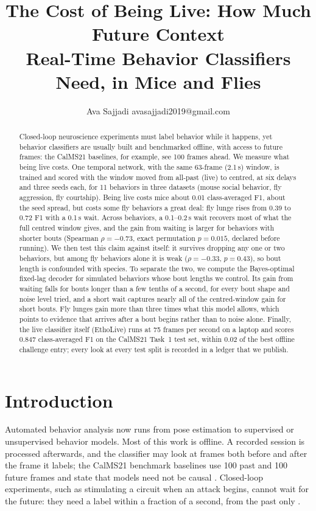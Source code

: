 \documentclass[10pt]{article}
\title{The Cost of Being Live: How Much Future Context\\ Real-Time Behavior Classifiers Need, in Mice and Flies}
\author{\name Ava Sajjadi \email avasajjadi2019@gmail.com \\
      \addr \todo{affiliation}}
\begin{document}
\maketitle

\begin{abstract}
Closed-loop neuroscience experiments must label behavior while it happens, yet behavior classifiers are usually built and benchmarked offline, with access to future frames: the CalMS21 baselines, for example, see 100 frames ahead. We measure what being live costs. One temporal network, with the same 63-frame (2.1\,s) window, is trained and scored with the window moved from all-past (live) to centred, at six delays and three seeds each, for 11 behaviors in three datasets (mouse social behavior, fly aggression, fly courtship). Being live costs mice about 0.01 class-averaged F1, about the seed spread, but costs some fly behaviors a great deal: fly lunge rises from 0.39 to 0.72 F1 with a 0.1\,s wait. Across behaviors, a 0.1--0.2\,s wait recovers most of what the full centred window gives, and the gain from waiting is larger for behaviors with shorter bouts (Spearman $\rho=-0.73$, exact permutation $p=0.015$, declared before running). We then test this claim against itself: it survives dropping any one or two behaviors, but among fly behaviors alone it is weak ($\rho=-0.33$, $p=0.43$), so bout length is confounded with species. To separate the two, we compute the Bayes-optimal fixed-lag decoder for simulated behaviors whose bout lengths we control. Its gain from waiting falls for bouts longer than a few tenths of a second, for every bout shape and noise level tried, and a short wait captures nearly all of the centred-window gain for short bouts. Fly lunges gain more than three times what this model allows, which points to evidence that arrives after a bout begins rather than to noise alone. Finally, the live classifier itself (EthoLive) runs at 75 frames per second on a laptop and scores 0.847 class-averaged F1 on the CalMS21 Task~1 test set, within 0.02 of the best offline challenge entry; every look at every test split is recorded in a ledger that we publish.
\end{abstract}

\section{Introduction}

Automated behavior analysis now runs from pose estimation \citep{mathis2018deeplabcut,pereira2022sleap} to supervised \citep{segalin2021mars,goodwin2024simba} or unsupervised \citep{weinreb2024keypointmoseq} behavior models. Most of this work is offline. A recorded session is processed afterwards, and the classifier may look at frames both before and after the frame it labels; the CalMS21 benchmark baselines use 100 past and 100 future frames and state that models need not be causal \citep{sun2021calms21}. Closed-loop experiments, such as stimulating a circuit when an attack begins, cannot wait for the future: they need a label within a fraction of a second, from the past only \citep{schweihoff2021deeplabstream,kane2020realtime,yamanouchi2026yoru}.
\end{document}
